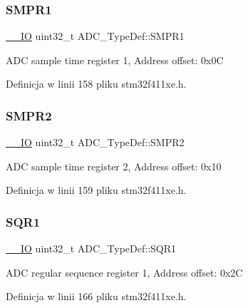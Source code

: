 \subsubsection{\texorpdfstring{S\+M\+P\+R1}{SMPR1}}
{\footnotesize\ttfamily \hyperlink{core__sc300_8h_aec43007d9998a0a0e01faede4133d6be}{\+\_\+\+\_\+\+IO} uint32\+\_\+t A\+D\+C\+\_\+\+Type\+Def\+::\+S\+M\+P\+R1}

A\+DC sample time register 1, Address offset\+: 0x0C 

Definicja w linii 158 pliku stm32f411xe.\+h.

\mbox{\label{struct_a_d_c___type_def_a9e68fe36c4c8fbbac294b5496ccf7130}} 
\subsubsection{\texorpdfstring{S\+M\+P\+R2}{SMPR2}}
{\footnotesize\ttfamily \hyperlink{core__sc300_8h_aec43007d9998a0a0e01faede4133d6be}{\+\_\+\+\_\+\+IO} uint32\+\_\+t A\+D\+C\+\_\+\+Type\+Def\+::\+S\+M\+P\+R2}

A\+DC sample time register 2, Address offset\+: 0x10 

Definicja w linii 159 pliku stm32f411xe.\+h.

\mbox{\label{struct_a_d_c___type_def_a0185aa54962ba987f192154fb7a2d673}} 
\subsubsection{\texorpdfstring{S\+Q\+R1}{SQR1}}
{\footnotesize\ttfamily \hyperlink{core__sc300_8h_aec43007d9998a0a0e01faede4133d6be}{\+\_\+\+\_\+\+IO} uint32\+\_\+t A\+D\+C\+\_\+\+Type\+Def\+::\+S\+Q\+R1}

A\+DC regular sequence register 1, Address offset\+: 0x2C 

Definicja w linii 166 pliku stm32f411xe.\+h.

\mbox{\label{struct_a_d_c___type_def_a6b6e55e6c667042e5a46a76518b73d5a}} 
